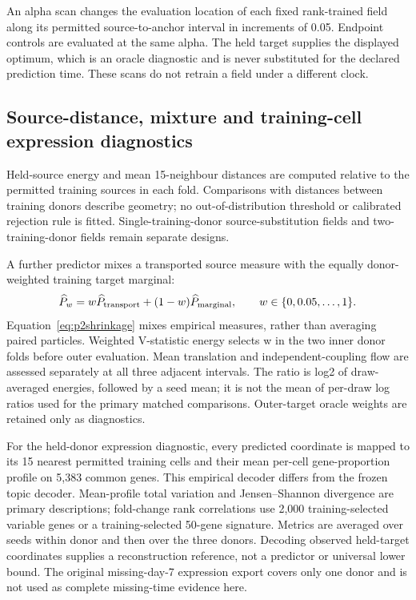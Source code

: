 \documentclass[10pt,a4paper]{article}
\begin{document}
An alpha scan changes the evaluation location of each fixed rank-trained field along its permitted source-to-anchor interval in increments of 0.05. Endpoint controls are evaluated at the same alpha. The held target supplies the displayed optimum, which is an oracle diagnostic and is never substituted for the declared prediction time. These scans do not retrain a field under a different clock.

\subsection{Source-distance, mixture and training-cell expression diagnostics}
Held-source energy and mean 15-neighbour distances are computed relative to the permitted training sources in each fold. Comparisons with distances between training donors describe geometry; no out-of-distribution threshold or calibrated rejection rule is fitted. Single-training-donor source-substitution fields and two-training-donor fields remain separate designs.

A further predictor mixes a transported source measure with the equally donor-weighted training target marginal:
\begin{equation}
\widehat P_w=w\widehat P_{\rm transport}+(1-w)\widehat P_{\rm marginal},\qquad w\in\{0,0.05,\ldots,1\}.\label{eq:p2shrinkage}
\end{equation}
Equation~\eqref{eq:p2shrinkage} mixes empirical measures, rather than averaging paired particles. Weighted V-statistic energy selects w in the two inner donor folds before outer evaluation. Mean translation and independent-coupling flow are assessed separately at all three adjacent intervals. The ratio is log2 of draw-averaged energies, followed by a seed mean; it is not the mean of per-draw log ratios used for the primary matched comparisons. Outer-target oracle weights are retained only as diagnostics.

For the held-donor expression diagnostic, every predicted coordinate is mapped to its 15 nearest permitted training cells and their mean per-cell gene-proportion profile on 5,383 common genes. This empirical decoder differs from the frozen topic decoder. Mean-profile total variation and Jensen--Shannon divergence are primary descriptions; fold-change rank correlations use 2,000 training-selected variable genes or a training-selected 50-gene signature. Metrics are averaged over seeds within donor and then over the three donors. Decoding observed held-target coordinates supplies a reconstruction reference, not a predictor or universal lower bound. The original missing-day-7 expression export covers only one donor and is not used as complete missing-time evidence here.
\end{document}
